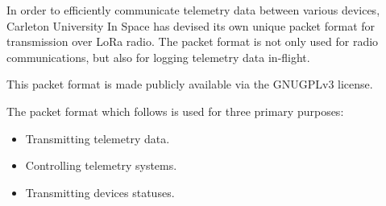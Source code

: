 In order to efficiently communicate telemetry data between various devices, Carleton University In Space has devised
its own unique packet format for transmission over LoRa radio. The packet format is not only used for radio
communications, but also for logging telemetry data in-flight.

This packet format is made publicly available via the GNUGPLv3 license.

The packet format which follows is used for three primary purposes:

\begin{itemize}
    \item Transmitting telemetry data.
    \item Controlling telemetry systems.
    \item Transmitting devices statuses.
\end{itemize}
